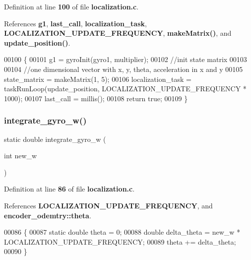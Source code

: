 Definition at line \textbf{ 100} of file \textbf{ localization.\+c}.



References \textbf{ g1}, \textbf{ last\+\_\+call}, \textbf{ localization\+\_\+task}, \textbf{ L\+O\+C\+A\+L\+I\+Z\+A\+T\+I\+O\+N\+\_\+\+U\+P\+D\+A\+T\+E\+\_\+\+F\+R\+E\+Q\+U\+E\+N\+CY}, \textbf{ make\+Matrix()}, and \textbf{ update\+\_\+position()}.


\begin{DoxyCode}
00100                                                                                                            
                    \{
00101   g1 = gyroInit(gyro1, multiplier);
00102   \textcolor{comment}{//init state matrix}
00103 
00104   \textcolor{comment}{//one dimensional vector with x, y, theta, acceleration in x and y}
00105   state_matrix = makeMatrix(1, 5);
00106   localization_task = taskRunLoop(update_position, LOCALIZATION_UPDATE_FREQUENCY * 1000);
00107   last_call = millis();
00108   \textcolor{keywordflow}{return} \textcolor{keyword}{true};
00109 \}
\end{DoxyCode}
\mbox{\label{localization_8c_ac103fff038e59ff45f292b9b5138182e}} 
\subsubsection{integrate\+\_\+gyro\+\_\+w()}
{\footnotesize\ttfamily static double integrate\+\_\+gyro\+\_\+w (\begin{DoxyParamCaption}\item[{int}]{new\+\_\+w }\end{DoxyParamCaption})\hspace{0.3cm}{\ttfamily [static]}}



Definition at line \textbf{ 86} of file \textbf{ localization.\+c}.



References \textbf{ L\+O\+C\+A\+L\+I\+Z\+A\+T\+I\+O\+N\+\_\+\+U\+P\+D\+A\+T\+E\+\_\+\+F\+R\+E\+Q\+U\+E\+N\+CY}, and \textbf{ encoder\+\_\+odemtry\+::theta}.


\begin{DoxyCode}
00086                                           \{
00087   \textcolor{keyword}{static} \textcolor{keywordtype}{double} theta = 0;
00088   \textcolor{keywordtype}{double} delta\_theta = new\_w * LOCALIZATION_UPDATE_FREQUENCY;
00089   theta += delta\_theta;
00090 \}
\end{DoxyCode}
\mbox{\label{localization_8c_afacd5e0b3d5e677df26a4402bbd9ec9e}} 
